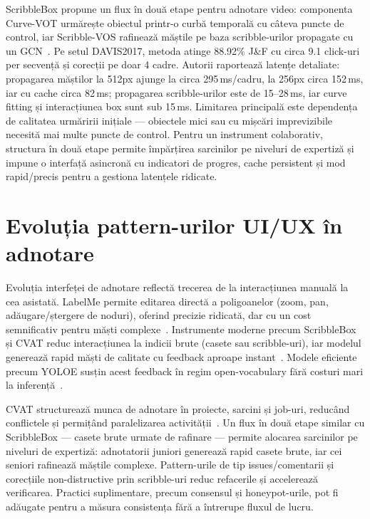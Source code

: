 ScribbleBox propune un flux în două etape pentru adnotare video: componenta Curve-VOT urmărește obiectul printr-o curbă temporală cu câteva puncte de control, iar Scribble-VOS rafinează măștile pe baza scribble-urilor propagate cu un GCN~\cite{chen2020scribbleboxinteractiveannotationframework}. Pe setul DAVIS2017, metoda atinge 88.92\% J\&F cu circa 9.1 click-uri per secvență și corecții pe doar 4 cadre. Autorii raportează latențe detaliate: propagarea măștilor la 512px ajunge la circa 295\,ms/cadru, la 256px circa 152\,ms, iar cu cache circa 82\,ms; propagarea scribble-urilor este de 15--28\,ms, iar curve fitting și interacțiunea box sunt sub 15\,ms. Limitarea principală este dependența de calitatea urmăririi inițiale — obiectele mici sau cu mișcări imprevizibile necesită mai multe puncte de control. Pentru un instrument colaborativ, structura în două etape permite împărțirea sarcinilor pe niveluri de expertiză și impune o interfață asincronă cu indicatori de progres, cache persistent și mod rapid/precis pentru a gestiona latențele ridicate.

\section{Evoluția pattern-urilor UI/UX în adnotare}

Evoluția interfeței de adnotare reflectă trecerea de la interacțiunea manuală la cea asistată. LabelMe permite editarea directă a poligoanelor (zoom, pan, adăugare/ștergere de noduri), oferind precizie ridicată, dar cu un cost semnificativ pentru măști complexe~\cite{5483185}. Instrumente moderne precum ScribbleBox și CVAT reduc interacțiunea la indicii brute (casete sau scribble-uri), iar modelul generează rapid măști de calitate cu feedback aproape instant~\cite{chen2020scribbleboxinteractiveannotationframework,cvat2025}. Modele eficiente precum YOLOE susțin acest feedback în regim open-vocabulary fără costuri mari la inferență~\cite{wang2025yoloerealtimeseeing}.

CVAT structurează munca de adnotare în proiecte, sarcini și job-uri, reducând conflictele și permițând paralelizarea activității~\cite{cvat2025}. Un flux în două etape similar cu ScribbleBox — casete brute urmate de rafinare — permite alocarea sarcinilor pe niveluri de expertiză: adnotatorii juniori generează rapid casete brute, iar cei seniori rafinează măștile complexe. Pattern-urile de tip issues/comentarii și corecțiile non-distructive prin scribble-uri reduc refacerile și accelerează verificarea. Practici suplimentare, precum consensul și honeypot-urile, pot fi adăugate pentru a măsura consistența fără a întrerupe fluxul de lucru.

